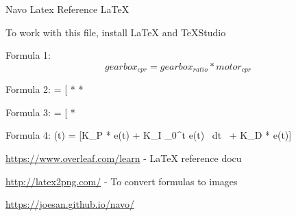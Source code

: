 \documentclass{article}
\begin{document}
Navo Latex Reference \LaTeX

To work with this file, install LaTeX and TeXStudio

Formula 1:
\[ gearbox_{cpr} = gearbox_{ratio} * motor_{cpr} \]

Formula 2:
\rpm = [ *  * \]

Formula 3:
\rpm = [ * \]

Formula 4:
\output(t) = [K_{P} * e(t) + K_{I} \int\limits_0^t e(t) \ dt \ + K_{D} *  e(t)]

\url{https://www.overleaf.com/learn} - LaTeX reference docu

\url{http://latex2png.com/} - To convert formulas to images

\url{https://joesan.github.io/navo/}
\end{document}
